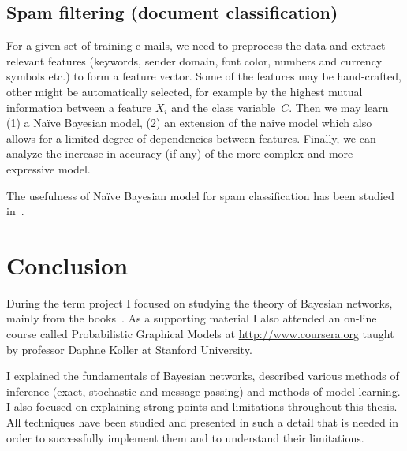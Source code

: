 \documentclass[english,cover]{fitthesis} %
\newcommand{\todo}[1]{{\color{red}#1}}
\begin{document}
\section{Spam filtering (document classification)}
For a given set of training e-mails, we need to preprocess the data and extract relevant features (keywords, sender domain, font color, numbers and currency symbols etc.) to form a feature vector. Some of the features may be hand-crafted, other might be automatically selected, for example by the highest mutual information between a feature $X_i$ and the class variable~$C$. Then we may learn (1) a Naïve Bayesian model, (2) an extension of the naive model which also allows for a limited degree of dependencies between features. Finally, we can analyze the increase in accuracy (if any) of the more complex and more expressive model.

The usefulness of Naïve Bayesian model for spam classification has been studied in~\cite{heckerman98_spam}.

\chapter{Conclusion}
During the term project I focused on studying the theory of Bayesian networks, mainly from the books~\cite{pgm,russell_norvig_ed2}. As a supporting material I also attended an on-line course called Probabilistic Graphical Models at \url{http://www.coursera.org} taught by professor Daphne Koller at Stanford University.

I explained the fundamentals of Bayesian networks, described various methods of inference (exact, stochastic and message passing) and methods of model learning. I also focused on explaining strong points and limitations throughout this thesis. All techniques have been studied and presented in such a detail that is needed in order to successfully implement them and to understand their limitations.
\end{document}
